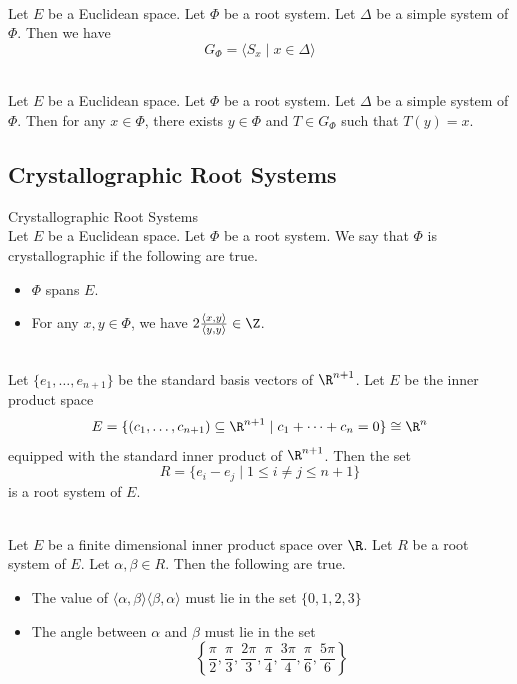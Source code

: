 \documentclass[a4paper]{article}
\begin{document}
\begin{lmm}{}{}\\
Let $E$ be a Euclidean space. Let $\Phi$ be a root system. Let $\Delta$ be a simple system of $\Phi$. Then we have $$G_\Phi=\langle S_x\;|\;x\in\Delta\rangle$$
\end{lmm}

\begin{crl}{}{}\\
Let $E$ be a Euclidean space. Let $\Phi$ be a root system. Let $\Delta$ be a simple system of $\Phi$. Then for any $x\in\Phi$, there exists $y\in\Phi$ and $T\in G_\Phi$ such that $T(y)=x$. 
\end{crl}

\subsection{Crystallographic Root Systems}
\begin{defn}{Crystallographic Root Systems}{}\\
Let $E$ be a Euclidean space. Let $\Phi$ be a root system. We say that $\Phi$ is crystallographic if the following are true. 
\begin{itemize}
\item $\Phi$ spans $E$. 
\item For any $x,y\in\Phi$, we have $2\frac{\langle x,y\rangle}{\langle y,y\rangle}\in\Z$. 
\end{itemize}
\end{defn}

\begin{eg}{}{} \\Let $\{e_1,\dots,e_{n+1}\}$ be the standard basis vectors of $\R^{n+1}$. Let $E$ be the inner product space $$E=\{(c_1,\dots,c_{n+1})\subseteq\R^{n+1}\;|\;c_1+\dots+c_n=0\}\cong\R^n$$ equipped with the standard inner product of $\R^{n+1}$. Then the set $$R=\{e_i-e_j\;|\;1\leq i\neq j\leq n+1\}$$ is a root system of $E$. 
\end{eg}

\begin{lmm}{}{} \\Let $E$ be a finite dimensional inner product space over $\R$. Let $R$ be a root system of $E$. Let $\alpha,\beta\in R$. Then the following are true. 
\begin{itemize}
\item The value of $\langle\alpha,\beta\rangle\langle\beta,\alpha\rangle$ must lie in the set $\{0,1,2,3\}$
\item The angle between $\alpha$ and $\beta$ must lie in the set $$\left\{\frac{\pi}{2},\frac{\pi}{3},\frac{2\pi}{3},\frac{\pi}{4},\frac{3\pi}{4},\frac{\pi}{6},\frac{5\pi}{6}\right\}$$
\end{itemize}
\end{lmm}
\end{document}
